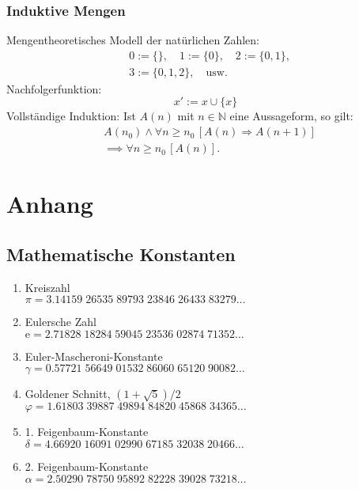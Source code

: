 \documentclass[a4paper,10pt,fleqn,twocolumn,twoside,openany]{book}
\numberwithin{equation}{chapter}
\newcommand{\ee}{\mathrm e}
\begin{document}
\subsection{Induktive Mengen}
Mengentheoretisches Modell der natürlichen Zahlen:
\begin{equation}
\begin{split}
& 0:=\{\},\quad 1:=\{0\},\quad 2:=\{0,1\},\\
& 3:=\{0,1,2\},\quad \text{usw.}
\end{split}
\end{equation}
Nachfolgerfunktion:
\begin{equation}
x' := x\cup\{x\}
\end{equation}
Vollständige Induktion: Ist $A(n)$ mit $n\in\mathbb N$
eine Aussageform, so gilt:
\begin{equation}
\begin{split}
& A(n_0)\land \forall n\ge n_0\,[A(n)\Rightarrow A(n+1)]\\
& \implies \forall n\ge n_0\,[A(n)].
\end{split}
\end{equation}

\chapter{Anhang}
\section{Mathematische Konstanten}
\begin{enumerate}
\item Kreiszahl\\
$\pi = 3.14159\;26535\;89793\;23846\;26433\;83279\ldots$

\item Eulersche Zahl\\
$\ee = 2.71828\;18284\;59045\;23536\;02874\;71352\ldots$

\item Euler-Mascheroni-Konstante\\
$\gamma = 0.57721\;56649\;01532\;86060\;65120\;90082\ldots$

\item Goldener Schnitt, $(1+\sqrt{5})/2$\\
$\varphi = 1.61803\;39887\;49894\;84820\;45868\;34365\ldots$

\item 1. Feigenbaum-Konstante\\
$\delta = 4.66920\;16091\;02990\;67185\;32038\;20466\ldots$

\item 2. Feigenbaum-Konstante\\
$\alpha = 2.50290\;78750\;95892\;82228\;39028\;73218\ldots$
\end{enumerate}
\end{document}
